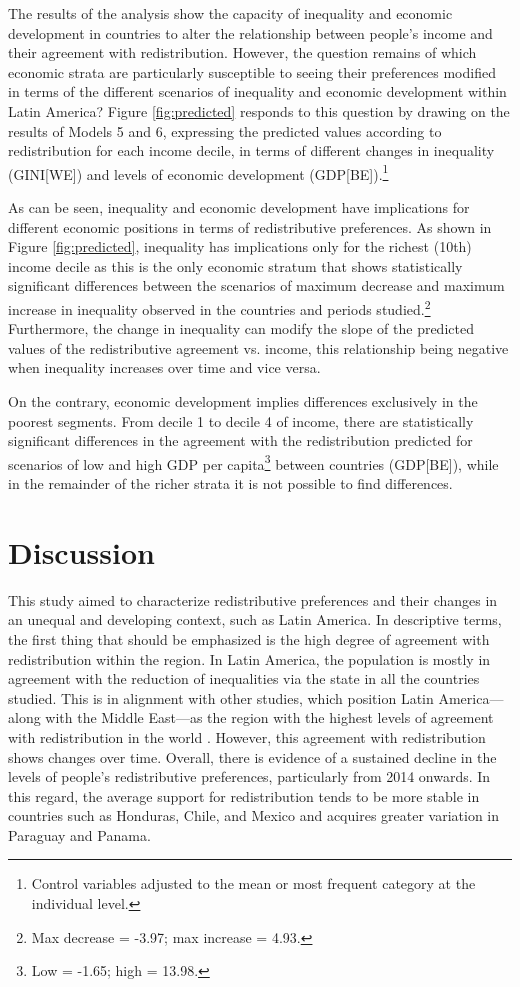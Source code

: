 \documentclass[utf8]{frontiersSCNS} %
\begin{document}
The results of the analysis show the capacity of inequality and economic development in countries to alter the relationship between people’s income and their agreement with redistribution. However, the question remains of which economic strata are particularly susceptible to seeing their preferences modified in terms of the different scenarios of inequality and economic development within Latin America? Figure \ref{fig:predicted} responds to this question by drawing on the results of Models 5 and 6, expressing the predicted values according to redistribution for each income decile, in terms of different changes in inequality (GINI[WE]) and levels of economic development (GDP[BE]).\footnote{Control variables adjusted to the mean or most frequent category at the individual level.}

As can be seen, inequality and economic development have implications for different economic positions in terms of redistributive preferences. As shown in Figure \ref{fig:predicted}, inequality has implications only for the richest (10th) income decile as this is the only economic stratum that shows statistically significant differences between the scenarios of maximum decrease and maximum increase in inequality observed in the countries and periods studied.\footnote{Max decrease = -3.97; max increase = 4.93.}  Furthermore, the change in inequality can modify the slope of the predicted values of the redistributive agreement vs. income, this relationship being negative when inequality increases over time and vice versa.

On the contrary, economic development implies differences exclusively in the poorest segments. From decile 1 to decile 4 of income, there are statistically significant differences in the agreement with the redistribution predicted for scenarios of low and high GDP per capita\footnote{Low = -1.65; high = 13.98.}  between countries (GDP[BE]), while in the remainder of the richer strata it is not possible to find differences.

\section{Discussion}

This study aimed to characterize redistributive preferences and their changes in an unequal and developing context, such as Latin America. In descriptive terms, the first thing that should be emphasized is the high degree of agreement with redistribution within the region. In Latin America, the population is mostly in agreement with the reduction of inequalities via the state in all the countries studied. This is in alignment with other studies, which position Latin America—along with the Middle East—as the region with the highest levels of agreement with redistribution in the world \parencite{DionEconomicDevelopmentIncome2010}. However, this agreement with redistribution shows changes over time. Overall, there is evidence of a sustained decline in the levels of people’s redistributive preferences, particularly from 2014 onwards. In this regard, the average support for redistribution tends to be more stable in countries such as Honduras, Chile, and Mexico and acquires greater variation in Paraguay and Panama.
\end{document}
